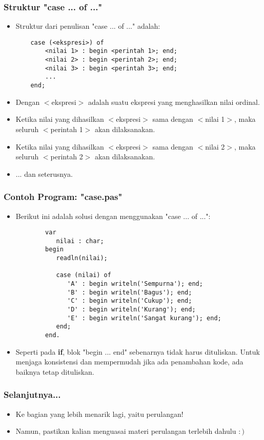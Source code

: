 \documentclass{beamer}
\begin{document}
\begin{frame}[fragile]
\frametitle{Struktur "case ... of ..."}
\begin{itemize}
	\item Struktur dari penulisan "case ... of ..." adalah:
	\begin{lstlisting}
	case (<ekspresi>) of
	    <nilai 1> : begin <perintah 1>; end;
	    <nilai 2> : begin <perintah 2>; end;
	    <nilai 3> : begin <perintah 3>; end;
	    ...
	end;
	\end{lstlisting}
	
	\item Dengan $<$ekspresi$>$ adalah suatu ekspresi yang menghasilkan \alert{nilai ordinal}.
	\item Ketika nilai yang dihasilkan $<$ekspresi$>$ sama dengan $<$nilai 1$>$, maka seluruh $<$perintah 1$>$ akan dilaksanakan.
	\item Ketika nilai yang dihasilkan $<$ekspresi$>$ sama dengan $<$nilai 2$>$, maka seluruh $<$perintah 2$>$ akan dilaksanakan.
	\item ... dan seterusnya.
\end{itemize}
\end{frame}

\begin{frame}[fragile]
\frametitle{Contoh Program: "case.pas"}
\begin{itemize}
	\item Berikut ini adalah solusi dengan menggunakan "case ... of ...":
	\begin{lstlisting}
		var
		   nilai : char;
		begin
		   readln(nilai);
		
		   case (nilai) of
		      'A' : begin writeln('Sempurna'); end;
		      'B' : begin writeln('Bagus'); end;
		      'C' : begin writeln('Cukup'); end;
		      'D' : begin writeln('Kurang'); end;
		      'E' : begin writeln('Sangat kurang'); end;
		   end;
		end.
	\end{lstlisting}
	\item Seperti pada \textbf{if}, blok "begin ... end" sebenarnya tidak harus dituliskan. Untuk menjaga konsistensi dan mempermudah \newline jika ada penambahan kode, ada baiknya tetap dituliskan.
\end{itemize}
\end{frame}

\begin{frame}
\frametitle{Selanjutnya...}
\begin{itemize}
	\item Ke bagian yang lebih menarik lagi, yaitu perulangan!
	\item Namun, pastikan kalian menguasai materi perulangan terlebih dahulu $:)$
\end{itemize}
\end{frame}
\end{document}
